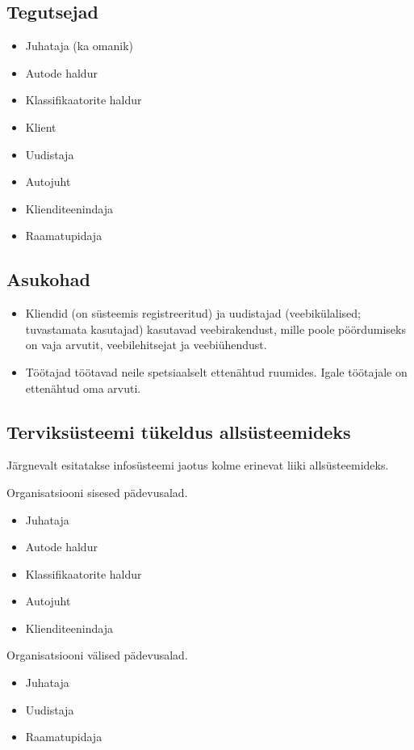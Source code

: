\documentclass{report}
\begin{document}
 \subsection{Tegutsejad}
 \begin{itemize}
 	\item Juhataja (ka omanik)
 	\item Autode haldur
 	\item Klassifikaatorite haldur
 	\item Klient
 	\item Uudistaja
 	\item Autojuht
 	\item Klienditeenindaja
 	\item Raamatupidaja
 \end{itemize}
 
  \subsection{Asukohad}
 \begin{itemize}
 	\item Kliendid (on süsteemis registreeritud) ja uudistajad (veebikülalised; tuvastamata kasutajad) kasutavad veebirakendust, mille poole pöördumiseks on vaja arvutit, veebilehitsejat ja veebiühendust.
 	\item Töötajad töötavad neile spetsiaalselt ettenähtud ruumides. Igale töötajale on ettenähtud oma arvuti. 
 \end{itemize}
 
  \subsection{Terviksüsteemi tükeldus allsüsteemideks}
  Järgnevalt esitatakse infosüsteemi jaotus kolme erinevat liiki allsüsteemideks.
  \\
  \par
  Organisatsiooni sisesed pädevusalad.
 \begin{itemize}
 	\item Juhataja
 	\item Autode haldur
 	\item Klassifikaatorite haldur
 	\item Autojuht
 	\item Klienditeenindaja
 \end{itemize}

Organisatsiooni välised pädevusalad.
 \begin{itemize}
	\item Juhataja
	\item Uudistaja
	\item Raamatupidaja
\end{itemize}
 
\end{document}
